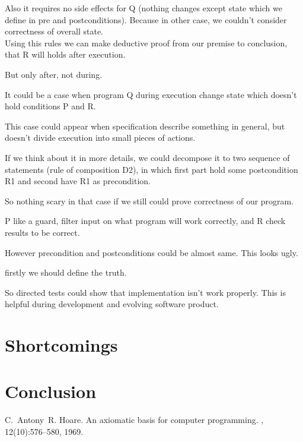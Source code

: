 \documentclass[twoside,twocolumn]{article}
\begin{document}
Also it requires no side effects for Q (nothing changes except state which
we define in pre and postconditions). Because in other case, we couldn't
consider correctness of overall state. \\


Using this rules we can make deductive proof from our premise to conclusion,
that R will holds after execution. 

But only after, not during.

It could be a case when program Q during execution
change state which doesn't hold conditions P and R.

This case could appear when specification describe something in general, but
doesn't divide execution into small pieces of actions.

If we think about it in more details, we could decompose it to two sequence of
statements (rule of composition D2), in which first part hold some postcondition
R1 and second have R1 as precondition.

So nothing scary in that case if we still could prove correctness of our program.

P like a guard, filter input on what program will work correctly, and R check
results to be correct. 





However precondition and postconditions could be almost same. This looks ugly.

firstly we should define the
truth. 

So directed tests could show that implementation isn't work properly. This is
helpful during development and evolving software product.





\section{Shortcomings}

\section{Conclusion}

\begin{thebibliography}{99} %

C.~Antony~R. Hoare.
\newblock An axiomatic basis for computer programming.
, 12(10):576--580, 1969.

\end{thebibliography}

\end{document}

